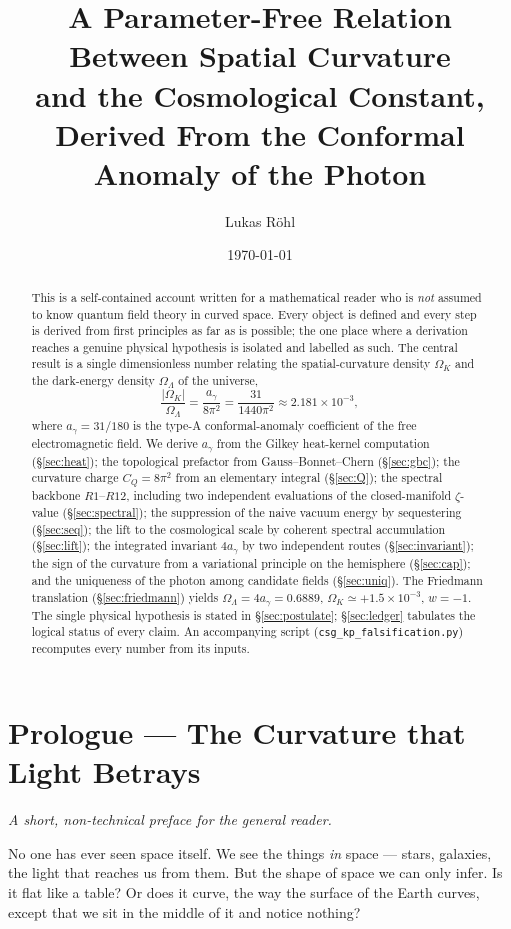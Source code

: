 \documentclass[11pt,a4paper]{article}
\title{A Parameter-Free Relation Between Spatial Curvature\\
and the Cosmological Constant,\\
Derived From the Conformal Anomaly of the Photon}
\author{Lukas R\"ohl}
\date{\today}
\theoremstyle{definition}
\theoremstyle{remark}
\newcommand{\ag}{a_\gamma}
\newcommand{\CQ}{C_Q}
\newcommand{\Ok}{\Omega_K}
\newcommand{\OL}{\Omega_\Lambda}
\begin{document}
\maketitle

\begin{abstract}
This is a self-contained account written for a mathematical reader who is \emph{not} assumed to
know quantum field theory in curved space. Every object is defined and every step is derived from
first principles as far as is possible; the one place where a derivation reaches a genuine
physical hypothesis is isolated and labelled as such. The central result is a single dimensionless
number relating the spatial-curvature density $\Ok$ and the dark-energy density $\OL$ of the
universe,
\[
\frac{\lvert\Ok\rvert}{\OL}=\frac{\ag}{8\pi^2}=\frac{31}{1440\pi^2}\approx 2.181\times10^{-3},
\]
where $\ag=31/180$ is the type-A conformal-anomaly coefficient of the free electromagnetic field.
We derive $\ag$ from the Gilkey heat-kernel computation (\S\ref{sec:heat}); the topological
prefactor from Gauss--Bonnet--Chern (\S\ref{sec:gbc}); the curvature charge $\CQ=8\pi^2$ from an
elementary integral (\S\ref{sec:Q}); the spectral backbone $R1$--$R12$, including two independent
evaluations of the closed-manifold $\zeta$-value (\S\ref{sec:spectral}); the suppression of the
naive vacuum energy by sequestering (\S\ref{sec:seq}); the lift to the cosmological scale by
coherent spectral accumulation (\S\ref{sec:lift}); the integrated invariant $4\ag$ by two
independent routes (\S\ref{sec:invariant}); the sign of the curvature from a variational principle
on the hemisphere (\S\ref{sec:cap}); and the uniqueness of the photon among candidate fields
(\S\ref{sec:uniq}). The Friedmann translation (\S\ref{sec:friedmann}) yields $\OL=4\ag=0.6889$,
$\Ok\simeq+1.5\times10^{-3}$, $w=-1$. The single physical hypothesis is stated in
\S\ref{sec:postulate}; \S\ref{sec:ledger} tabulates the logical status of every claim. An
accompanying script (\texttt{csg\_kp\_falsification.py}) recomputes every number from its inputs.
\end{abstract}

\section*{Prologue --- The Curvature that Light Betrays}
\textit{A short, non-technical preface for the general reader.}

\medskip
No one has ever seen space itself. We see the things \emph{in} space --- stars, galaxies, the
light that reaches us from them. But the shape of space we can only infer. Is it flat like a
table? Or does it curve, the way the surface of the Earth curves, except that we sit in the middle
of it and notice nothing?
\end{document}
